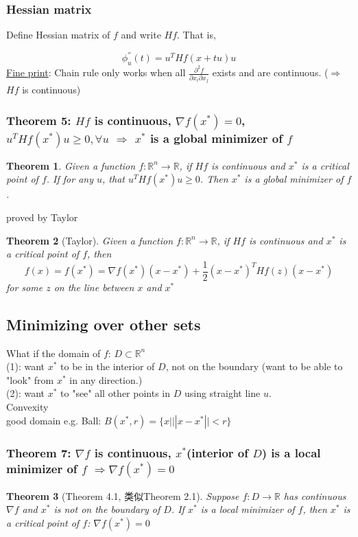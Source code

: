 \documentclass[11pt,a4paper]{article}
\newtheorem{theorem}{Theorem}
\begin{document}
\subsubsection{Hessian matrix}
Define Hessian matrix of $f$ and write $Hf$. That is,

$$\phi^{''}_u (t)=u^T Hf(x+tu) u$$
\underline{Fine print}: Chain rule only works when all $\frac{\partial^2 f}{\partial x_i\partial x_j}$ exists and are continuous. ($\Rightarrow$ $Hf$ is continuous)\\

\subsubsection{Theorem 5: $Hf$ is continuous, $\nabla f(x^*)=0$, $u^T Hf(x^*) u\geq 0,\forall u$ $\Rightarrow$ $x^*$ is a global minimizer of $f$}
\begin{theorem}
    Given a function $f:\mathbb{R}^n \rightarrow \mathbb{R}$, if $Hf$ is continuous and $x^*$ is a critical point of
    $f$. If for any $u$, that $u^T Hf(x^*) u\geq 0$. Then $x^*$ is a global minimizer of $f$.
\end{theorem}
proved by Taylor
\begin{theorem}[Taylor]
    Given a function $f:\mathbb{R}^n \rightarrow \mathbb{R}$, if $Hf$ is continuous and $x^*$ is a critical point of $f$, then
    $$f(x)=f(x^*)=\nabla f(x^*)(x-x^*)+\frac{1}{2}(x-x^*)^T Hf(z) (x-x^*)$$
for some $z$ on the line between $x$ and $x^*$
\end{theorem}





\subsection{Minimizing over other sets}
What if the domain of $f$: $D\subset \mathbb{R}^n$\\
(1): want $x^*$ to be in the interior of $D$, not on the boundary (want to be able to "look" from $x^*$ in any direction.)\\
(2): want $x^*$ to "see" all other points in $D$ using straight line $u$.\\
Convexity\\
good domain e.g. Ball: $B(x^*,r)=\{x| ||x-x^*||<r \}$

\subsubsection{Theorem 7: $\nabla f$ is continuous, $x^*$(interior of $D$) is a local minimizer of $f$ $\Rightarrow \nabla f(x^*)=0$}
\begin{theorem}[Theorem 4.1, 类似Theorem 2.1]
    Suppose $f: D \rightarrow\mathbb{R}$ has continuous $\nabla f$ and $x^*$ is not on the boundary of $D$. If $x^*$ is a local minimizer of $f$, then $x^*$ is a critical point of $f$: $\nabla f(x^*)=0$
\end{theorem}
\end{document}
